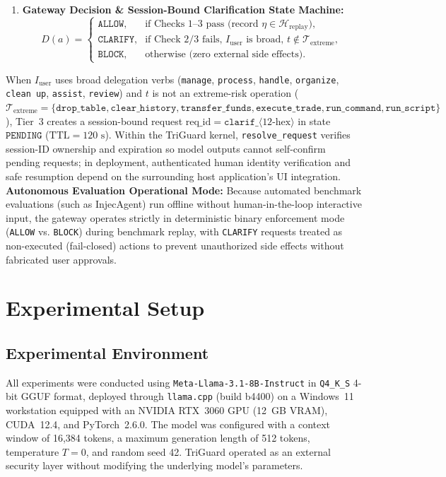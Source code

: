 \documentclass[conference]{IEEEtran}
\begin{document}
\begin{enumerate}
\begin{itemize}
    \end{itemize}
    \item \textbf{Gateway Decision \& Session-Bound Clarification State Machine:}
    \begin{equation}
    D(a) = \begin{cases}
    \texttt{ALLOW}, & \text{if Checks 1--3 pass (record }\eta \in \mathcal{H}_{\text{replay}}\text{)}, \\
    \texttt{CLARIFY}, & \text{if Check 2/3 fails, } I_{\text{user}} \text{ is broad, } t \notin \mathcal{T}_{\text{extreme}}, \\
    \texttt{BLOCK}, & \text{otherwise (zero external side effects).}
    \end{cases}
    \end{equation}
\end{enumerate}
When $I_{\text{user}}$ uses broad delegation verbs (\texttt{manage}, \texttt{process}, \texttt{handle}, \texttt{organize}, \texttt{clean up}, \texttt{assist}, \texttt{review}) and $t$ is not an extreme-risk operation ($\mathcal{T}_{\text{extreme}} = \{\texttt{drop\_table}, \texttt{clear\_history}, \texttt{transfer\_funds}, \texttt{execute\_trade}, \texttt{run\_command}, \texttt{run\_script}\}$), Tier~3 creates a session-bound request $\text{req\_id} = \texttt{clarif\_}\langle 12\text{-hex}\rangle$ in state $\texttt{PENDING}$ ($\text{TTL}=120\text{ s}$). Within the TriGuard kernel, \texttt{resolve\_request} verifies session-ID ownership and expiration so model outputs cannot self-confirm pending requests; in deployment, authenticated human identity verification and safe resumption depend on the surrounding host application's UI integration. \textbf{Autonomous Evaluation Operational Mode:} Because automated benchmark evaluations (such as InjecAgent) run offline without human-in-the-loop interactive input, the gateway operates strictly in deterministic binary enforcement mode (\texttt{ALLOW} vs. \texttt{BLOCK}) during benchmark replay, with \texttt{CLARIFY} requests treated as non-executed (fail-closed) actions to prevent unauthorized side effects without fabricated user approvals.

\section{Experimental Setup}
\subsection{Experimental Environment}
All experiments were conducted using \texttt{Meta-Llama-3.1-8B-Instruct} in \texttt{Q4\_K\_S} 4-bit GGUF format, deployed through \texttt{llama.cpp} (build b4400) on a Windows~11 workstation equipped with an NVIDIA RTX~3060 GPU (12~GB VRAM), CUDA~12.4, and PyTorch~2.6.0. The model was configured with a context window of 16,384 tokens, a maximum generation length of 512 tokens, temperature $T = 0$, and random seed 42. TriGuard operated as an external security layer without modifying the underlying model's parameters.
\end{document}
